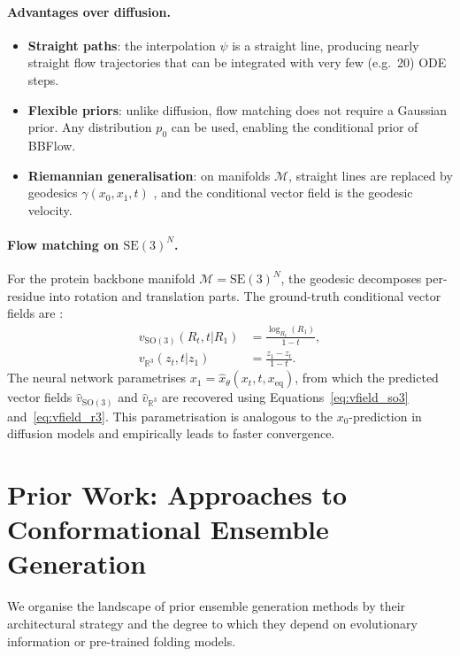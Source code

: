 \documentclass[12pt,a4paper]{article}
\newcommand{\xeq}{x_{\mathrm{eq}}}
\newcommand{\SE}{\mathrm{SE}(3)}
\newcommand{\SOthree}{\mathrm{SO}(3)}
\newcommand{\Rthree}{\mathbb{R}^3}
\begin{document}
\paragraph{Advantages over diffusion.}
\begin{itemize}
  \item \textbf{Straight paths}: the interpolation $\psi$ is a straight line, producing nearly
    straight flow trajectories that can be integrated with very few (e.g.\ 20) ODE steps.
  \item \textbf{Flexible priors}: unlike diffusion, flow matching does not require a Gaussian
    prior.  Any distribution $p_0$ can be used, enabling the conditional prior of BBFlow.
  \item \textbf{Riemannian generalisation}: on manifolds $\mathcal{M}$, straight lines are
    replaced by geodesics $\gamma(x_0, x_1, t)$ \citep{chen2024}, and the conditional
    vector field is the geodesic velocity.
\end{itemize}

\paragraph{Flow matching on $\SE^N$.}
For the protein backbone manifold $\mathcal{M} = \SE^N$, the geodesic decomposes per-residue
into rotation and translation parts.  The ground-truth conditional vector fields are
\citep{yim2023frameflow}:
\begin{align}
  \label{eq:vfield_so3}
  v_{\SOthree}(R_t, t | R_1) &= \frac{\log_{R_t}(R_1)}{1-t}, \\
  \label{eq:vfield_r3}
  v_{\Rthree}(z_t, t | z_1) &= \frac{z_1 - z_t}{1-t}.
\end{align}
The neural network parametrises $x_1 = \hat{x}_\theta(x_t, t, \xeq)$, from which the
predicted vector fields $\hat{v}_{\SOthree}$ and $\hat{v}_{\Rthree}$ are recovered using
Equations~\eqref{eq:vfield_so3} and~\eqref{eq:vfield_r3}.  This parametrisation is analogous
to the $x_0$-prediction in diffusion models and empirically leads to faster convergence.

\section{Prior Work: Approaches to Conformational Ensemble Generation}
\label{sec:related}

We organise the landscape of prior ensemble generation methods by their architectural strategy
and the degree to which they depend on evolutionary information or pre-trained folding models.
\end{document}
